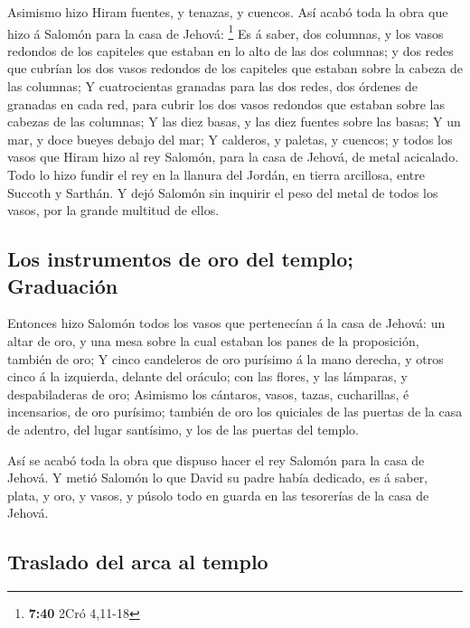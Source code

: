  Asimismo hizo Hiram fuentes, y tenazas, y cuencos. Así
acabó toda la obra que hizo á Salomón para la casa de Jehová:
\footnote{\textbf{7:40} 2Cró 4,11-18}  Es á saber, dos
columnas, y los vasos redondos de los capiteles que estaban en lo alto
de las dos columnas; y dos redes que cubrían los dos vasos redondos de
los capiteles que estaban sobre la cabeza de las columnas;
 Y cuatrocientas granadas para las dos redes, dos órdenes
de granadas en cada red, para cubrir los dos vasos redondos que estaban
sobre las cabezas de las columnas;  Y las diez basas, y
las diez fuentes sobre las basas;  Y un mar, y doce
bueyes debajo del mar;  Y calderos, y paletas, y cuencos;
y todos los vasos que Hiram hizo al rey Salomón, para la casa de Jehová,
de metal acicalado.  Todo lo hizo fundir el rey en la
llanura del Jordán, en tierra arcillosa, entre Succoth y Sarthán.
 Y dejó Salomón sin inquirir el peso del metal de todos
los vasos, por la grande multitud de ellos.

\hypertarget{los-instrumentos-de-oro-del-templo-graduaciuxf3n}{%
\subsection{Los instrumentos de oro del templo;
Graduación}\label{los-instrumentos-de-oro-del-templo-graduaciuxf3n}}

 Entonces hizo Salomón todos los vasos que pertenecían á
la casa de Jehová: un altar de oro, y una mesa sobre la cual estaban los
panes de la proposición, también de oro;  Y cinco
candeleros de oro purísimo á la mano derecha, y otros cinco á la
izquierda, delante del oráculo; con las flores, y las lámparas, y
despabiladeras de oro;  Asimismo los cántaros, vasos,
tazas, cucharillas, é incensarios, de oro purísimo; también de oro los
quiciales de las puertas de la casa de adentro, del lugar santísimo, y
los de las puertas del templo.

 Así se acabó toda la obra que dispuso hacer el rey
Salomón para la casa de Jehová. Y metió Salomón lo que David su padre
había dedicado, es á saber, plata, y oro, y vasos, y púsolo todo en
guarda en las tesorerías de la casa de Jehová.

\hypertarget{traslado-del-arca-al-templo}{%
\subsection{Traslado del arca al
templo}\label{traslado-del-arca-al-templo}}

